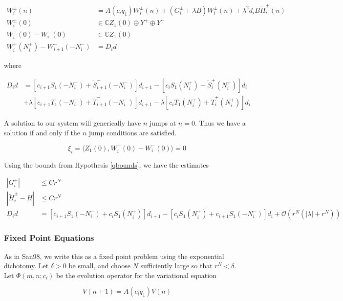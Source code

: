 \documentclass[12pt]{article}
\def\C{{\mathbb C}}
\begin{document}
\begin{align*}
W_i^\pm(n) &= A(c_i q_1) W_i^\pm(n) + (G_i^\pm + \lambda B) W_i^\pm(n) + \lambda^2 d_i B \tilde{H}_i^\pm(n) \\
W_i^\pm(0) &\in \C Z_1(0) \oplus Y^+ \oplus Y^- \\
W_i^+(0) - W_i^-(0) &\in \C Z_1(0) \\
W_i^+(N_i^+) - W_{i+1}^-(-N_i^-) &= D_i d
\end{align*}

where

\begin{align*}
D_i d &= [ c_{i+1} S_1(-N_i^-) + \tilde{S}_{i+1}^-(-N_i^-)] d_{i+1}
- [ c_i S_1(N_i^+) + \tilde{S}_i^+(N_i^+)] d_i \\
&+ \lambda[ c_{i+1} T_1(-N_i^-) + \tilde{T}_{i+1}^-(-N_i^-)] d_{i+1}
- \lambda[ c_i T_1(N_i^+) + \tilde{T}_i^+(N_i^+)] d_i 
\end{align*}

A solution to our system will generically have $n$ jumps at $n = 0$. Thus we have a solution if and only if the $n$ jump conditions are satisfied.

\begin{equation}\label{jumpcond}
\xi_i = \langle Z_1(0), W_i^+(0) - W_i^-(0) \rangle = 0
\end{equation}

Using the bounds from Hypothesis \ref{qbounds}, we have the estimates

\begin{align*}
|G_i^\pm| &\leq C r^N \\
|\tilde{H}_i^\pm - H| &\leq C r^N \\
D_i d &= [ c_{i+1} S_1(-N_i^-) + c_i S_1(N_i^+) ] d_{i+1}
- [ c_i S_1(N_i^+) + c_{i+1} S_1(-N_i^-) ] d_i 
+\mathcal{O}(r^N( |\lambda| + r^N))
\end{align*}

\subsubsection{Fixed Point Equations}

As in San98, we write this as a fixed point problem using the exponential dichotomy. Let $\delta > 0$ be small, and choose $N$ sufficiently large so that $r^N < \delta$. \\

Let $\Phi(m, n; c_i)$ be the evolution operator for the variational equation

\[
V(n+1) = A(c_i q_1) V(n) 
\]
\end{document}
